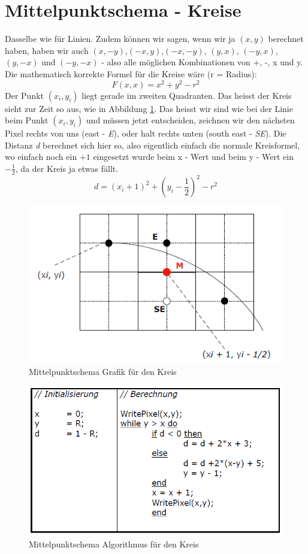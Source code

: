 \section{Mittelpunktschema - Kreise}
Dasselbe wie für Linien. Zudem können wir sagen, wenn wir ja \((x,y)\) berechnet haben, haben wir auch \((x,-y)\),\((-x,y)\),\((-x,-y)\), \((y,x)\), \((-y,x)\), \((y,-x)\) und \((-y,-x)\) - also alle möglichen Kombinationen von +, -, x und y. Die mathematisch korrekte Formel für die Kreise wäre (r = Radius):
\begin{displaymath}
F(x,x) = x^2 + y^2 - r^2
\end{displaymath}
Der Punkt \((x_i,y_i)\) liegt gerade im zweiten Quadranten. Das heisst der Kreis sieht zur Zeit so aus, wie in Abbildung \ref{fig:mittelpunktschema_kreis}. Das heisst wir sind wie bei der Linie beim Punkt \((x_i,y_i)\) und müssen jetzt entscheiden, zeichnen wir den nächsten Pixel rechts von uns (east - \textit{E}), oder halt rechts unten (south east - \textit{SE}). Die Distanz \textit{d} berechnet sich hier so, also eigentlich einfach die normale Kreisformel, wo einfach noch ein \(+1\) eingesetzt wurde beim x - Wert und beim y - Wert ein \(- \frac{1}{2}\), da der Kreis ja etwas fällt.
\begin{displaymath}
d = (x_i + 1)^2 + (y_i - \frac{1}{2})^2 - r^2
\end{displaymath}
\begin{figure}[!ht]
	\centering
	\includegraphics[width=0.4\linewidth]{fig/mittelpunktschema_kreis}
	\caption{Mittelpunktschema Grafik für den Kreis}
	\label{fig:mittelpunktschema_kreis}
\end{figure}

\begin{figure}[!ht]
	\centering
	\includegraphics[width=0.4\linewidth]{fig/mittelpunktschema_algo_kreis}
	\caption{Mittelpunktschema Algorithmus für den Kreis}
	\label{mittelpunktschema_algo_kreis}
\end{figure}
